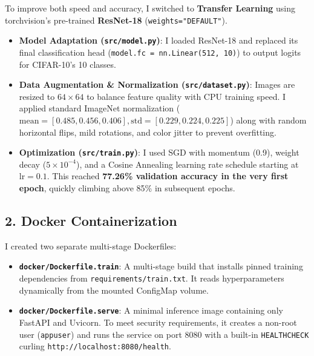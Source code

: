 \documentclass[11pt,a4paper]{article}
\begin{document}
To improve both speed and accuracy, I switched to \textbf{Transfer Learning} using torchvision's pre-trained \textbf{ResNet-18} (\texttt{weights="DEFAULT"}).
\begin{itemize}[noitemsep]
    \item \textbf{Model Adaptation (\texttt{src/model.py})}: I loaded ResNet-18 and replaced its final classification head (\texttt{model.fc = nn.Linear(512, 10)}) to output logits for CIFAR-10's 10 classes.
    \item \textbf{Data Augmentation \& Normalization (\texttt{src/dataset.py})}: Images are resized to $64 \times 64$ to balance feature quality with CPU training speed. I applied standard ImageNet normalization ($\text{mean}=[0.485, 0.456, 0.406], \text{std}=[0.229, 0.224, 0.225]$) along with random horizontal flips, mild rotations, and color jitter to prevent overfitting.
    \item \textbf{Optimization (\texttt{src/train.py})}: I used SGD with momentum (0.9), weight decay ($5\times 10^{-4}$), and a Cosine Annealing learning rate schedule starting at $\text{lr}=0.1$. This reached \textbf{77.26\% validation accuracy in the very first epoch}, quickly climbing above 85\% in subsequent epochs.
\end{itemize}

\subsection{2. Docker Containerization}
I created two separate multi-stage Dockerfiles:
\begin{itemize}[noitemsep]
    \item \textbf{\texttt{docker/Dockerfile.train}}: A multi-stage build that installs pinned training dependencies from \texttt{requirements/train.txt}. It reads hyperparameters dynamically from the mounted ConfigMap volume.
    \item \textbf{\texttt{docker/Dockerfile.serve}}: A minimal inference image containing only FastAPI and Uvicorn. To meet security requirements, it creates a non-root user (\texttt{appuser}) and runs the service on port 8080 with a built-in \texttt{HEALTHCHECK} curling \texttt{http://localhost:8080/health}.
\end{itemize}
\end{document}
